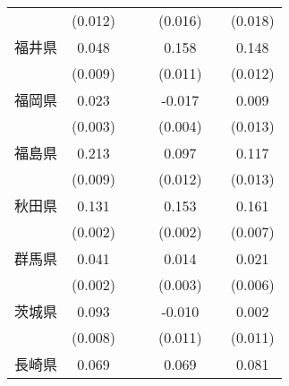 \begin{table}[htbp]
\begin{tabular}{l*{6}{c}}
                    &     (0.012)         &                     &                     &     (0.016)         &                     &     (0.018)         \\
福井県              &       0.048\sym{***}&                     &                     &       0.158\sym{***}&                     &       0.148\sym{***}\\
                    &     (0.009)         &                     &                     &     (0.011)         &                     &     (0.012)         \\
福岡県              &       0.023\sym{***}&                     &                     &      -0.017\sym{***}&                     &       0.009         \\
                    &     (0.003)         &                     &                     &     (0.004)         &                     &     (0.013)         \\
福島県              &       0.213\sym{***}&                     &                     &       0.097\sym{***}&                     &       0.117\sym{***}\\
                    &     (0.009)         &                     &                     &     (0.012)         &                     &     (0.013)         \\
秋田県              &       0.131\sym{***}&                     &                     &       0.153\sym{***}&                     &       0.161\sym{***}\\
                    &     (0.002)         &                     &                     &     (0.002)         &                     &     (0.007)         \\
群馬県              &       0.041\sym{***}&                     &                     &       0.014\sym{***}&                     &       0.021\sym{***}\\
                    &     (0.002)         &                     &                     &     (0.003)         &                     &     (0.006)         \\
茨城県              &       0.093\sym{***}&                     &                     &      -0.010         &                     &       0.002         \\
                    &     (0.008)         &                     &                     &     (0.011)         &                     &     (0.011)         \\
長崎県              &       0.069\sym{***}&                     &                     &       0.069\sym{***}&                     &       0.081\sym{***}\\

\end{tabular}
\end{table}

